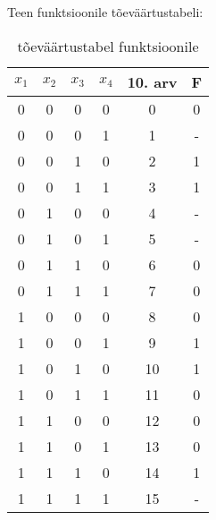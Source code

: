 Teen funktsioonile tõeväärtustabeli:
\begin{table}[H]
\centering
\caption{tõeväärtustabel funktsioonile}
\label{truth-table}
\begin{tabular}{|c|c|c|c|c||c|}
\hline
$x_1$ & $x_2$ & $x_3$ & $x_4$ & 10. arv & F \\ \hline\hline
0  & 0  & 0  & 0  & 0       & 0 \\ \hline
0  & 0  & 0  & 1  & 1       & - \\ \hline
0  & 0  & 1  & 0  & 2       & 1 \\ \hline
0  & 0  & 1  & 1  & 3       & 1 \\ \hline
0  & 1  & 0  & 0  & 4       & - \\ \hline
0  & 1  & 0  & 1  & 5       & - \\ \hline
0  & 1  & 1  & 0  & 6       & 0 \\ \hline
0  & 1  & 1  & 1  & 7       & 0 \\ \hline
1  & 0  & 0  & 0  & 8       & 0 \\ \hline
1  & 0  & 0  & 1  & 9       & 1 \\ \hline
1  & 0  & 1  & 0  & 10      & 1 \\ \hline
1  & 0  & 1  & 1  & 11      & 0 \\ \hline
1  & 1  & 0  & 0  & 12      & 0 \\ \hline
1  & 1  & 0  & 1  & 13      & 0 \\ \hline
1  & 1  & 1  & 0  & 14      & 1 \\ \hline
1  & 1  & 1  & 1  & 15      & - \\ \hline
\end{tabular}
\end{table}
